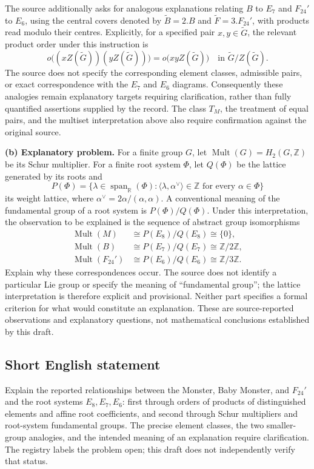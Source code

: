 \documentclass[11pt]{article}
\newcommand{\Z}{\mathbb{Z}}
\newcommand{\R}{\mathbb{R}}
\begin{document}
The source additionally asks for analogous explanations relating \(B\) to \(E_7\) and \(F_{24}'\) to \(E_6\), using the central covers denoted by \(\widetilde B=2.B\) and \(\widetilde F=3.F_{24}'\), with products read modulo their centres. Explicitly, for a specified pair \(x,y\in\widetilde G\), the relevant product order under this instruction is
\[
o\bigl((xZ(\widetilde G))(yZ(\widetilde G))\bigr)
=o\bigl(xyZ(\widetilde G)\bigr)
\quad\text{in }\widetilde G/Z(\widetilde G).
\]
The source does not specify the corresponding element classes, admissible pairs, or exact correspondence with the \(E_7\) and \(E_6\) diagrams. Consequently these analogies remain explanatory targets requiring clarification, rather than fully quantified assertions supplied by the record. The class \(T_M\), the treatment of equal pairs, and the multiset interpretation above also require confirmation against the original source.

\textbf{(b) Explanatory problem.} For a finite group \(G\), let \(\operatorname{Mult}(G)=H_2(G,\Z)\) be its Schur multiplier. For a finite root system \(\Phi\), let \(Q(\Phi)\) be the lattice generated by its roots and
\[
P(\Phi)=\{\lambda\in\operatorname{span}_{\R}(\Phi):
\langle\lambda,\alpha^\vee\rangle\in\Z\text{ for every }\alpha\in\Phi\}
\]
its weight lattice, where \(\alpha^\vee=2\alpha/(\alpha,\alpha)\). A conventional meaning of the fundamental group of a root system is \(P(\Phi)/Q(\Phi)\). Under this interpretation, the observation to be explained is the sequence of abstract group isomorphisms
\[
\begin{aligned}
\operatorname{Mult}(M)&\cong P(E_8)/Q(E_8)\cong\{0\},\\
\operatorname{Mult}(B)&\cong P(E_7)/Q(E_7)\cong\Z/2\Z,\\
\operatorname{Mult}(F_{24}')&\cong P(E_6)/Q(E_6)\cong\Z/3\Z.
\end{aligned}
\]
Explain why these correspondences occur. The source does not identify a particular Lie group or specify the meaning of ``fundamental group''; the lattice interpretation is therefore explicit and provisional. Neither part specifies a formal criterion for what would constitute an explanation. These are source-reported observations and explanatory questions, not mathematical conclusions established by this draft.
\subsection{Short English statement}
Explain the reported relationships between the Monster, Baby Monster, and \(F_{24}'\) and the root systems \(E_8,E_7,E_6\): first through orders of products of distinguished elements and affine root coefficients, and second through Schur multipliers and root-system fundamental groups. The precise element classes, the two smaller-group analogies, and the intended meaning of an explanation require clarification. The registry labels the problem open; this draft does not independently verify that status.
\end{document}
